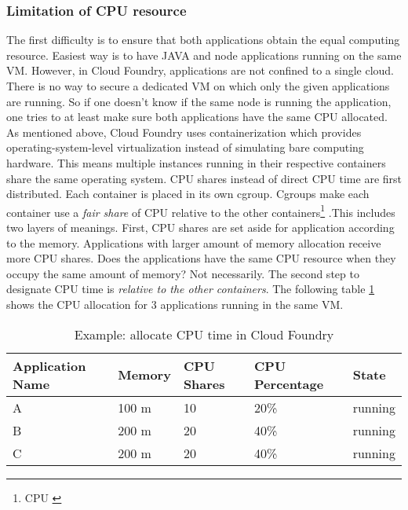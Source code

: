 \subsubsection{Limitation of CPU resource}
\label{cpu limitation}
The first difficulty is to ensure that both applications obtain the equal computing resource. Easiest way is to have JAVA and node applications running on the same VM. However, in Cloud Foundry, applications are not confined to a single cloud. There is no way to secure a dedicated VM on which only the given applications are running. So if one doesn't know if the same node is running the application, one tries to at least make sure both applications have the same CPU allocated. As mentioned above, Cloud Foundry uses containerization which provides operating-system-level virtualization instead of simulating bare computing hardware. This means multiple instances running in their respective containers share the same operating system. CPU shares instead of direct CPU time are first distributed. Each container is placed in its own cgroup. Cgroups make each container use a \textit{fair share} of CPU relative to the other containers\footnote{CPU  \citep{CGroup} } .This includes two layers of meanings. First, CPU shares are set aside for application according to the memory. Applications with larger amount of memory allocation receive more CPU shares. Does the applications have the same CPU resource when they occupy the same amount of memory? Not necessarily. The second step to designate CPU time is \textit{relative to the other containers}. The following table \ref{CPU time in Cloud Foundry} shows the CPU allocation for 3 applications running in the same VM. 
\begin{table}[h]
	\caption{Example: allocate CPU time in Cloud Foundry}
	\label{CPU time in Cloud Foundry}
	\renewcommand{\arraystretch}{1.2}
	\centering
	\sffamily
	\begin{footnotesize}
		\begin{tabular}{l l l l l }
			\toprule
			\textbf{Application Name} & \textbf{Memory} & \textbf{CPU Shares}& \textbf{CPU Percentage} }& \textbf{State}\\
			\midrule
		    A 	&	100	m & 10 & 20\%   & running\\
			B	&	200 m & 20 & 40\% & running\\
			C	&	200 m &	20 & 40\% & running\\
			\bottomrule
		\end{tabular}
	\end{footnotesize}
	\rmfamily
\end{table}

